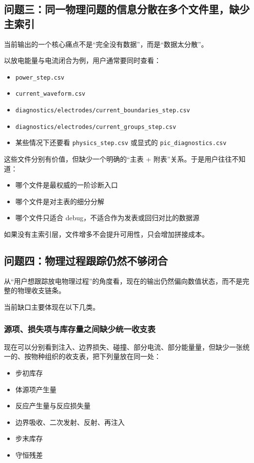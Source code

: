 \documentclass[11pt,a4paper]{ctexart}
\newcommand{\file}[1]{\texttt{#1}}
\begin{document}
\subsection{问题三：同一物理问题的信息分散在多个文件里，缺少主索引}

当前输出的一个核心痛点不是“完全没有数据”，而是“数据太分散”。

以放电能量与电流闭合为例，用户通常要同时查看：

\begin{itemize}
  \item \file{power\_step.csv}
  \item \file{current\_waveform.csv}
  \item \file{diagnostics/electrodes/current\_boundaries\_step.csv}
  \item \file{diagnostics/electrodes/current\_groups\_step.csv}
  \item 某些情况下还要看 \file{physics\_step.csv} 或显式的 \file{pic\_diagnostics.csv}
\end{itemize}

这些文件分别有价值，但缺少一个明确的“主表 + 附表”关系。于是用户往往不知道：

\begin{itemize}
  \item 哪个文件是最权威的一阶诊断入口
  \item 哪个文件是对主表的细分分解
  \item 哪个文件只适合 debug，不适合作为发表或回归对比的数据源
\end{itemize}

如果没有主索引层，文件增多不会提升可用性，只会增加拼接成本。

\subsection{问题四：物理过程跟踪仍然不够闭合}

从“用户想跟踪放电物理过程”的角度看，现在的输出仍然偏向数值状态，而不是完整的物理收支链条。

当前缺口主要体现在以下几类。

\subsubsection{源项、损失项与库存量之间缺少统一收支表}

现在可以分别看到注入、边界损失、碰撞、部分电流、部分能量量，但缺少一张统一的、按物种组织的收支表，把下列量放在同一处：

\begin{itemize}
  \item 步初库存
  \item 体源项产生量
  \item 反应产生量与反应损失量
  \item 边界吸收、二次发射、反射、再注入
  \item 步末库存
  \item 守恒残差
\end{itemize}
\end{document}
